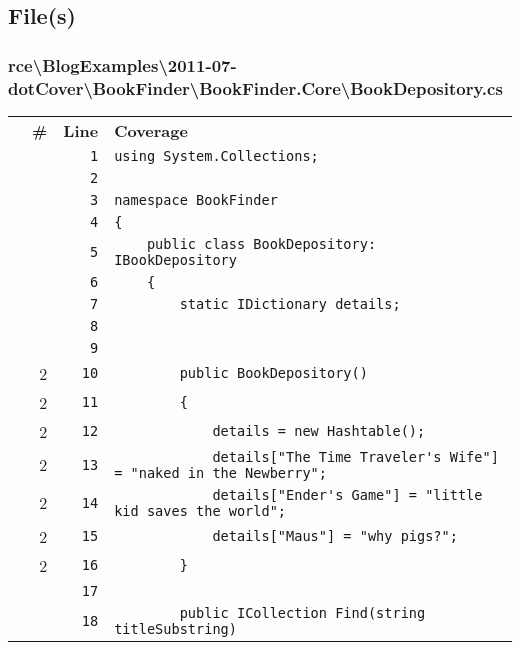\documentclass[a4paper,10pt]{article}
\begin{document}
\subsection{File(s)}
\subsubsection{rce\textbackslash BlogExamples\textbackslash 2011-07-dotCover\textbackslash BookFinder\textbackslash BookFinder.Core\textbackslash BookDepository.cs}
\begin{longtable}[l]{lrrl}
\textbf{} & \textbf{\#} & \textbf{Line} & \textbf{Coverage}\\
\cellcolor{gray} &  & \verb~1~ & \verb~using System.Collections;~\\
\cellcolor{gray} &  & \verb~2~ & \verb~~\\
\cellcolor{gray} &  & \verb~3~ & \verb~namespace BookFinder~\\
\cellcolor{gray} &  & \verb~4~ & \verb~{~\\
\cellcolor{gray} &  & \verb~5~ & \verb~    public class BookDepository: IBookDepository~\\
\cellcolor{gray} &  & \verb~6~ & \verb~    {~\\
\cellcolor{gray} &  & \verb~7~ & \verb~        static IDictionary details;~\\
\cellcolor{gray} &  & \verb~8~ & \verb~~\\
\cellcolor{gray} &  & \verb~9~ & \verb~~\\
\cellcolor{green} & 2 & \verb~10~ & \verb~        public BookDepository()~\\
\cellcolor{green} & 2 & \verb~11~ & \verb~        {~\\
\cellcolor{green} & 2 & \verb~12~ & \verb~            details = new Hashtable();~\\
\cellcolor{green} & 2 & \verb~13~ & \verb~            details["The Time Traveler's Wife"] = "naked in the Newberry";~\\
\cellcolor{green} & 2 & \verb~14~ & \verb~            details["Ender's Game"] = "little kid saves the world";~\\
\cellcolor{green} & 2 & \verb~15~ & \verb~            details["Maus"] = "why pigs?";~\\
\cellcolor{green} & 2 & \verb~16~ & \verb~        }~\\
\cellcolor{gray} &  & \verb~17~ & \verb~~\\
\cellcolor{gray} &  & \verb~18~ & \verb~        public ICollection Find(string titleSubstring)~\\

\end{longtable}
\end{document}
